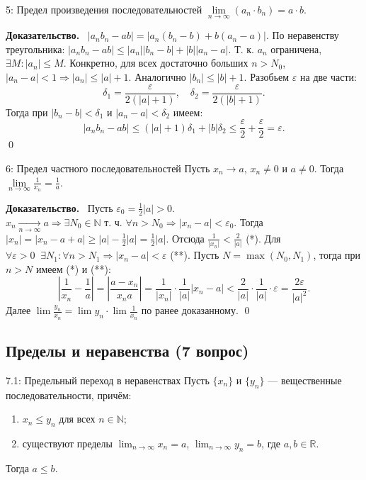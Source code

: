 \documentclass[a4paper,12pt]{article}
\newcommand{\myproof}{\textbf{Доказательство.}\ }
\begin{document}
	\begin{theorembox}{5: Предел произведения последовательностей}
		$\lim\limits_{n \to \infty} (a_n \cdot b_n) = a \cdot b$.
	\end{theorembox}
	\myproof
	$|a_n b_n - ab| = |a_n(b_n - b) + b(a_n - a)|$. По неравенству треугольника:
	$|a_n b_n - ab| \le |a_n||b_n - b| + |b||a_n - a|$.
	Т. к. $a_n$ ограничена, $\exists M \colon |a_n| \le M$. Конкретно, для всех достаточно больших $n > N_0$, $|a_n - a| < 1 \Rightarrow |a_n| \le |a| + 1$. Аналогично $|b_n| \le |b| + 1$.
	Разобьем $\varepsilon$ на две части:
	\[ \delta_1 = \frac{\varepsilon}{2(|a|+1)}, \quad \delta_2 = \frac{\varepsilon}{2(|b|+1)} \text{.} \]
	Тогда при $|b_n - b| < \delta_1$ и $|a_n - a| < \delta_2$ имеем:
	\[ |a_n b_n - ab| \le (|a|+1)\delta_1 + |b|\delta_2 \le \frac{\varepsilon}{2} + \frac{\varepsilon}{2} = \varepsilon \text{.} \] \qed
	
	\begin{theorembox}{6: Предел частного последовательностей}
		Пусть $x_n \to a$, $x_n \neq 0$ и $a \neq 0$. Тогда $\lim\limits_{n \to \infty} \frac{1}{x_n} = \frac{1}{a}$.
	\end{theorembox}
	\myproof
	Пусть $\varepsilon_0 = \frac{1}{2}|a| > 0$.
	$x_n \xrightarrow[n \to \infty]{} a \Rightarrow \exists N_0 \in \mathbb{N} \text{ т. ч. } \forall n > N_0 \Rightarrow |x_n - a| < \varepsilon_0$.
	Тогда $|x_n| = |x_n - a + a| \ge |a| - \frac{1}{2}|a| = \frac{1}{2}|a|$.
	Отсюда $\frac{1}{|x_n|} < \frac{2}{|a|}$ (*).
	Для $\forall \varepsilon > 0 \;\; \exists N_1 \colon \forall n > N_1 \Rightarrow |x_n - a| < \varepsilon$ (**).
	Пусть $N = \max(N_0, N_1)$, тогда при $n > N$ имеем (*) и (**):
	\[ \left| \frac{1}{x_n} - \frac{1}{a} \right| = \left| \frac{a - x_n}{x_n a} \right| = \frac{1}{|x_n|} \cdot \frac{1}{|a|} |x_n - a| < \frac{2}{|a|} \cdot \frac{1}{|a|} \cdot \varepsilon = \frac{2\varepsilon}{|a|^2} \text{.} \]
	Далее $\lim \frac{y_n}{x_n} = \lim y_n \cdot \lim \frac{1}{x_n}$ по ранее доказанному. \qed
	
	
	
	
	
	\subsection{Пределы и неравенства (7 вопрос)}
	
	\begin{theorembox}{7.1: Предельный переход в неравенствах}
		Пусть $\{x_n\}$ и $\{y_n\}$ — вещественные последовательности, причём:
		\begin{enumerate}
			\item $x_n \le y_n$ для всех $n \in \mathbb{N}$;
			\item существуют пределы $\lim_{n \to \infty} x_n = a$, $\lim_{n \to \infty} y_n = b$, где $a, b \in \mathbb{R}$.
		\end{enumerate}
		Тогда $a \le b$.
	\end{theorembox}
	
\end{document}
